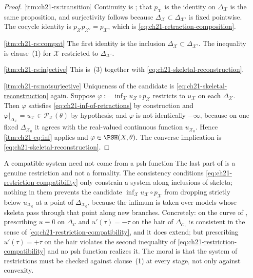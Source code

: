 \begin{proof}
\cref{itm:ch21-rs:transition}  Continuity is
; that \(p_{\mathcal X}\) is the identity on
\(\Delta_{\mathcal X}\) is the same proposition, and surjectivity follows
because \(\Delta_{\mathcal X}\subset\Delta_{\mathcal X'}\) is fixed
pointwise.  The cocycle identity is
\(p_{\mathcal X}p_{\mathcal X'}=p_{\mathcal X}\), which is
\eqref{eq:ch21-retraction-composition}.

\cref{itm:ch21-rs:compat}  The first identity is the inclusion
\(\Delta_{\mathcal X}\subset\Delta_{\mathcal X'}\).  The inequality is
clause~(1) for \(\mathcal X\) restricted to \(\Delta_{\mathcal X'}\).

\cref{itm:ch21-rs:injective}  This is
\,(3) together with
\eqref{eq:ch21-skeletal-reconstruction}.

\cref{itm:ch21-rs:notsurjective}  Uniqueness of the candidate is
\eqref{eq:ch21-skeletal-reconstruction} again.  Suppose
\(\varphi:=\inf_{\mathcal X}u_{\mathcal X}\circ p_{\mathcal X}\) restricts
to \(u_{\mathcal X}\) on each \(\Delta_{\mathcal X}\).  Then \(\varphi\)
satisfies \eqref{eq:ch21-inf-of-retractions} by construction and
\(\varphi|_{\Delta_{\mathcal X}}=u_{\mathcal X}\in
\mathcal P_{\mathcal X}(\theta)\) by hypothesis; and \(\varphi\) is not
identically \(-\infty\), because on one fixed \(\Delta_{\mathcal X_0}\) it
agrees with the real-valued continuous function \(u_{\mathcal X_0}\).
Hence \,\cref{itm:ch21-eq:inf} applies and
\(\varphi\in\PSH(X,\theta)\).  The converse implication is
\eqref{eq:ch21-skeletal-reconstruction}.
\end{proof}

\begin{warning}{A compatible system need not come from a psh function}
The last part of  is a genuine
restriction and not a formality.  The consistency conditions
\eqref{eq:ch21-restriction-compatibility} only constrain a system along
inclusions of skeleta; nothing in them prevents the candidate
\(\inf_{\mathcal X}u_{\mathcal X}\circ p_{\mathcal X}\) from dropping
strictly below \(u_{\mathcal X_0}\) at a point of
\(\Delta_{\mathcal X_0}\), because the infimum is taken over models whose
skeleta pass through that point along new branches.  Concretely: on the
curve of , prescribing \(u\equiv0\) on
\(\Delta_{\mathcal C}\) and \(u'(\tau)=-\tau\) on the hair of
\(\Delta_{\mathcal C_1}\) is consistent in the sense of
\eqref{eq:ch21-restriction-compatibility}, and it does extend; but
prescribing \(u'(\tau)=+\tau\) on the hair violates the second inequality of
\eqref{eq:ch21-restriction-compatibility} and no psh function realizes it.
The moral is that the system of restrictions must be checked against
clause~(1) at every stage, not only against convexity.
\end{warning}

